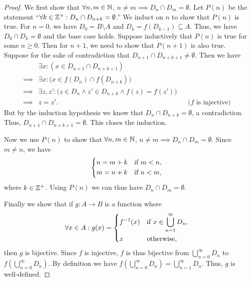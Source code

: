 \begin{proof}
  We first show that \(\forall n, m \in \mathbb{N}\), \(n \neq m \implies D_n \cap D_m = \emptyset\).
  Let \(P(n)\) be the statement ``\(\forall k \in \mathbb{Z}^+ : D_n \cap D_{n + k} = \emptyset\).''
  We induct on \(n\) to show that \(P(n)\) is true.
  For \(n = 0\), we have \(D_0 = B \setminus A\) and \(D_k = f(D_{k - 1}) \subseteq A\).
  Thus, we have \(D_0 \cap D_k = \emptyset\) and the base case holds.
  Suppose inductively that \(P(n)\) is true for some \(n \geq 0\).
  Then for \(n + 1\), we need to show that \(P(n + 1)\) is also true.
  Suppose for the sake of contradiction that \(D_{n + 1} \cap D_{n + k + 1} \neq \emptyset\).
  Then we have
  \begin{align*}
             & \exists x : (x \in D_{n + 1} \cap D_{n + k + 1})                                                               \\
    \implies & \exists x : \big(x \in f(D_n) \cap f(D_{n + k})\big)                                                           \\
    \implies & \exists z, z' : \big(z \in D_n \land z' \in D_{n + k} \land f(z) = f(z')\big)                                  \\
    \implies & z = z'.                                                                       &  & \text{(\(f\) is injective)}
  \end{align*}
  But by the induction hypothesis we know that \(D_n \cap D_{n + k} = \emptyset\), a contradiction.
  Thus, \(D_{n + 1} \cap D_{n + k + 1} = \emptyset\).
  This closes the induction.

  Now we use \(P(n)\) to show that \(\forall n, m \in \mathbb{N}\), \(n \neq m \implies D_n \cap D_m = \emptyset\).
  Since \(m \neq n\), we have
  \[
    \begin{dcases}
      n = m + k & \text{if } m < n, \\
      m = n + k & \text{if } n < m,
    \end{dcases}
  \]
  where \(k \in \mathbb{Z}^+\).
  Using \(P(n)\) we can thus have \(D_n \cap D_m = \emptyset\).

  Finally we show that if \(g : A \to B\) is a function where
  \[
    \forall x \in A : g(x) = \begin{dcases}
      f^{-1}(x) & \text{if } x \in \bigcup_{n = 1}^\infty D_n, \\
      x         & \text{otherwise},
    \end{dcases}
  \]
  then \(g\) is bijective.
  Since \(f\) is injective, \(f\) is thus bijective from \(\bigcup_{n = 0}^\infty D_n\) to \(f(\bigcup_{n = 0}^\infty D_n)\).
  By definition we have \(f(\bigcup_{n = 0}^\infty D_n) = \bigcup_{n = 1}^\infty D_n\).
  Thus, \(g\) is well-defined.


\end{proof}
